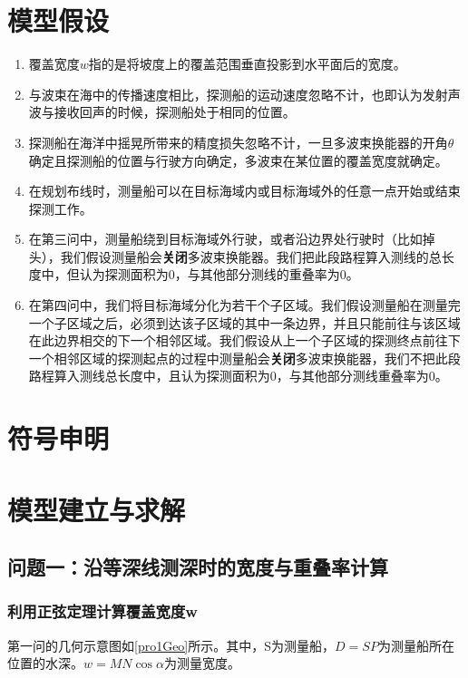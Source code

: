 \documentclass{article}
\begin{document}
\section{模型假设}
\begin{enumerate}
	\item 覆盖宽度$w$指的是将坡度上的覆盖范围垂直投影到水平面后的宽度。
	\item 与波束在海中的传播速度相比，探测船的运动速度忽略不计，也即认为发射声波与接收回声的时候，探测船处于相同的位置。
	\item 探测船在海洋中摇晃所带来的精度损失忽略不计，一旦多波束换能器的开角$\theta$确定且探测船的位置与行驶方向确定，多波束在某位置的覆盖宽度就确定。
	\item 在规划布线时，测量船可以在目标海域内或目标海域外的任意一点开始或结束探测工作。
	\item 在第三问中，测量船绕到目标海域外行驶，或者沿边界处行驶时（比如掉头），我们假设测量船会\textbf{关闭}多波束换能器。我们把此段路程算入测线的总长度中，但认为探测面积为0，与其他部分测线的重叠率为0。
	\item 在第四问中，我们将目标海域分化为若干个子区域。我们假设测量船在测量完一个子区域之后，必须到达该子区域的其中一条边界，并且只能前往与该区域在此边界相交的下一个相邻区域。我们假设从上一个子区域的探测终点前往下一个相邻区域的探测起点的过程中测量船会\textbf{关闭}多波束换能器，我们不把此段路程算入测线总长度中，且认为探测面积为0，与其他部分测线重叠率为0。
\end{enumerate}

\section{符号申明}

\section{模型建立与求解}
\subsection{问题一：沿等深线测深时的宽度与重叠率计算}
\subsubsection{利用正弦定理计算覆盖宽度w}
	\par 第一问的几何示意图如\ref{pro1Geo}所示。其中，S为测量船，$D=SP$为测量船所在位置的水深。$w=MN\cos\alpha$为测量宽度。
	
\end{document}
